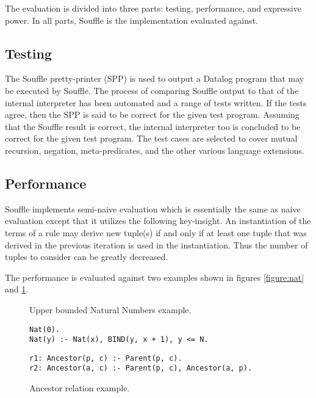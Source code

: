 The evaluation is divided into three parts: testing, performance, and expressive power. In all parts, Souffle\cite{SouffleHome} is the implementation evaluated against.

\subsection{Testing}
The Souffle pretty-printer (SPP) is used to output a Datalog program that may be executed by Souffle. The process of comparing Souffle output to that of the internal interpreter has been automated and a range of tests written. If the tests agree, then the SPP is said to be correct for the given test program. Assuming that the Souffle result is correct, the internal interpreter too is concluded to be correct for the given test program. The test cases are selected to cover mutual recursion, negation, meta-predicates, and the other various language extensions.

\subsection{Performance}
Souffle implements semi-naive evaluation\cite{Green:2013:DRQ:2688167.2688168} which is essentially the same as naive evaluation except that it utilizes the following key-insight. An instantiation of the terms of a rule may derive new tuple(s) if and only if at least one tuple that was derived in the previous iteration is used in the instantiation. Thus the number of tuples to consider can be greatly decreased. 

The performance is evaluated against two examples shown in figures \ref{figure:nat} and \ref{figure:ancestor}.
\vspace*{-15pt}
\begin{figure}[!ht]
\begin{minipage}[b]{.5\textwidth}
\caption{Upper bounded Natural Numbers example.}
\begin{verbatim}
Nat(0).
Nat(y) :- Nat(x), BIND(y, x + 1), y <= N.
\end{verbatim}
\label{figure:nat}
\end{minipage}
\begin{minipage}[b]{.5\textwidth}
\caption{Ancestor relation example.}
\begin{verbatim}
r1: Ancestor(p, c) :- Parent(p, c).                            
r2: Ancestor(a, c) :- Parent(p, c), Ancestor(a, p).
\end{verbatim}
\label{figure:ancestor}
\end{minipage}
\end{figure}
\noindent
\vspace*{-15pt}
